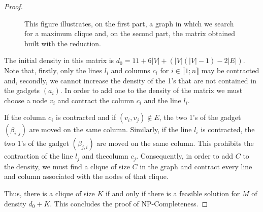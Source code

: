 \begin{proof}
\begin{figure}

\caption{This figure illustrates, on the first part, a graph in which we search for a maximum clique and, on the second part, the matrix obtained built with the reduction.}
\label{fig:reduction:example}
\end{figure}

The initial density in this matrix is $d_0 = 11 + 6|V| + (|V| (|V|-1) - 2|E|)$. Note that, firstly, only the lines $l_i$ and columns $c_i$ for $i \in \llbracket 1;n \rrbracket$ may be contracted and, secondly, we cannot increase the density of the 1's that are not contained in the gadgets $(a_i)$. In order to add one to the density of the matrix we must choose a node $v_i$ and contract the column $c_i$ and the line $l_i$. 

If the column $c_i$ is contracted and if $(v_i, v_j) \not \in E$, the two 1's of the gadget $(\beta_{i,j})$ are moved on the same column. Similarly, if the line $l_i$ is contracted, the two 1's of the gadget $(\beta_{j,i})$ are moved on the same column. This prohibits the contraction of the line $l_j$ and thecolumn $c_j$. Consequently, in order to add $C$ to the density, we must find a clique of size $C$ in the graph and contract every line and column associated with the nodes of that clique.

Thus, there is a clique of size $K$ if and only if there is a feasible solution for $M$ of density $d_0 + K$. This concludes the proof of NP-Completeness.

  \end{proof}
